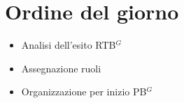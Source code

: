 \section*{Ordine del giorno}

\begin{itemize}
	\item Analisi dell'esito RTB$^G$
	\item Assegnazione ruoli
	\item Organizzazione per inizio PB$^G$
\end{itemize}

